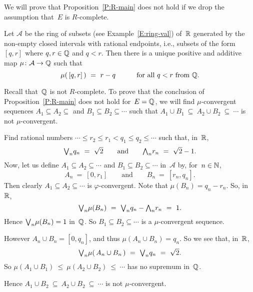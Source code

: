 \documentclass[main.tex]{subfiles}
\begin{document}
%
%
\begin{ex}
\label{E:P:R-main}
We will prove that Proposition~\ref{P:R-main}
does not hold if we drop the assumption that~$E$ is $R$-complete.

Let $\mathcal{A}$ be the ring of subsets (see Example~\ref{E:ring-val})
of~$\mathbb{R}$ generated by the non-empty closed intervals with rational endpoints,
i.e., subsets of the form $[q,r]$ where $q,r\in \mathbb{Q}$ and $q<r$.
Then there is a unique positive and additive map $\mu\colon\mathcal{A} \rightarrow\mathbb{Q}$
such that
\begin{equation*}
\mu(\,[q,r]\,) \ =\ r-q\qquad\quad\text{for all $q<r$ from $\mathbb{Q}$}.
\end{equation*}

Recall that~$\mathbb{Q}$ is not $R$-complete.
To prove that the conclusion of Proposition~\ref{P:R-main}
does not hold for~$E=\mathbb{Q}$, we will find $\mu$-convergent sequences $A_1 \subseteq A_2 \subseteq$
and $B_1 \subseteq B_2 \subseteq\dotsb$ such that
$A_1 \cup B_1 \ \subseteq\ A_2 \cup B_2 \ \subseteq\ \dotsb$
is not $\mu$-convergent.

Find rational numbers $ \dotsb \leq r_2 \leq r_1 < q_1 \leq q_2 \leq \dotsb$
such that, in~$\mathbb{R}$,
\begin{equation*}
\textstyle{\bigvee}_n q_n \ = \ \sqrt2\qquad\text{and}\qquad
\textstyle{\bigwedge}_n r_n \ = \ \sqrt2-1.
\end{equation*}
Now, let us define $A_1 \subseteq A_2 \subseteq \dotsb$
and $B_1 \subseteq B_2 \subseteq \dotsb$ in~$\mathcal{A}$
by, for~$n\in\mathbb{N}$,
\begin{equation*}
A_n  \ = \ [0, r_1]
\qquad\text{and}\qquad
B_n \ = \ [r_n,q_n].
\end{equation*}
Then clearly $A_1 \subseteq A_2 \subseteq \dotsb$
is $\varphi$-convergent.
Note that $\mu(B_n) = q_n - r_n$. So, in~$\mathbb{R}$,
\begin{equation*}
\bv_n \mu(B_n) \ =\ \bv_n q_n - \bw_n r_n \ =\ 1.
\end{equation*}
Hence $\textstyle{\bigvee}_n \mu(B_n)=1$ in~$\mathbb{Q}$.
So  $B_1 \subseteq B_2 \subseteq \dotsb$
is a $\mu$-convergent sequence.

However $A_n \cup B_n = [0,q_n]$,
and thus $\mu(A_n \cup B_n) = q_n$.
So we see that, in~$\mathbb{R}$,
\begin{equation*}
\bv_n \mu(\,A_n \cup B_n \,) \ =\ \bv_n q_n \ =\ \sqrt{2}.
\end{equation*}
So $\mu(A_1 \cup B_1) \ \leq\  \mu(A_2 \cup B_2) \ \leq\ \dotsb$
has no supremum in~$\mathbb{Q}$.

Hence $A_1 \cup B_2 \ \subseteq\ A_2 \cup B_2 \ \subseteq\ \dotsb$
is not $\mu$-convergent.




\end{ex}
\end{document}
